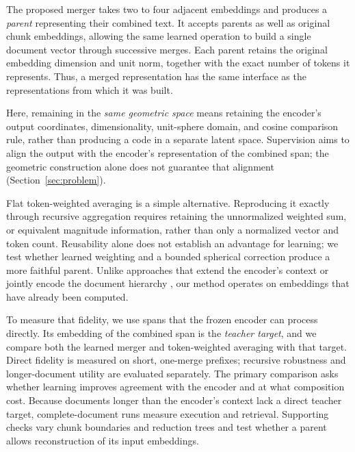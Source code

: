 \documentclass[10pt]{article}
\begin{document}
The proposed merger takes two to four adjacent embeddings and produces a
\emph{parent} representing their combined text. It accepts parents as well as
original chunk embeddings, allowing the same learned operation to build a
single document vector through successive merges. Each parent retains the
original embedding dimension and unit norm, together with the exact number of
tokens it represents. Thus, a merged representation has the same interface as
the representations from which it was built.

Here, remaining in the \emph{same geometric space} means retaining the encoder's
output coordinates, dimensionality, unit-sphere domain, and cosine comparison
rule, rather than producing a code in a separate latent space. Supervision aims to align the output with the encoder's representation of
the combined span; the geometric construction alone does not guarantee that
alignment (Section~\ref{sec:problem}).

Flat token-weighted averaging is a simple alternative. Reproducing it exactly
through recursive aggregation requires retaining the unnormalized weighted
sum, or equivalent magnitude information, rather than only a normalized
vector and token count. Reusability alone does not establish an advantage for
learning; we test whether learned weighting and a bounded spherical correction
produce a more faithful parent.
Unlike approaches that extend the encoder's context or jointly encode the
document hierarchy
\citep{beltagy-etal-2020-longformer,zaheer-etal-2020-bigbird,zhang-etal-2019-hibert,wu-etal-2021-hi},
our method operates on embeddings that have already been computed.

To measure that fidelity, we use spans that the frozen encoder can process
directly. Its embedding of the combined span is the \emph{teacher target},
and we compare both the learned merger and token-weighted averaging with that
target. Direct fidelity is measured on short, one-merge prefixes; recursive
robustness and longer-document utility are evaluated separately. The primary
comparison asks whether learning improves agreement with the encoder and at
what composition cost. Because documents longer than the encoder's context
lack a direct teacher target, complete-document runs measure execution and
retrieval. Supporting checks vary chunk boundaries and reduction trees and
test whether a parent allows reconstruction of its input embeddings.
\end{document}
